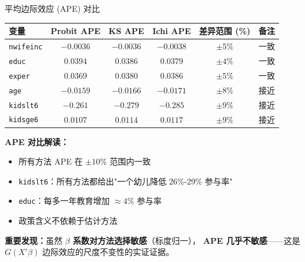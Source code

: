 \documentclass[aspectratio=169, 10pt]{beamer}
\begin{document}
\begin{frame}{平均边际效应 (APE) 对比}

  \begin{center}\footnotesize
  \begin{tabular}{l|c|c|c|c|c}
  \hline
  变量 & Probit APE & KS APE & Ichi APE & 差异范围 (\%) & 备注 \\
  \hline
  \texttt{nwifeinc} & $-0.0036$ & $-0.0036$ & $-0.0038$ & $\pm 5\%$ & 一致 \\
  \texttt{educ} & $0.0394$ & $0.0386$ & $0.0379$ & $\pm 4\%$ & 一致 \\
  \texttt{exper} & $0.0369$ & $0.0380$ & $0.0386$ & $\pm 5\%$ & 一致 \\
  \texttt{age} & $-0.0159$ & $-0.0166$ & $-0.0171$ & $\pm 8\%$ & 接近 \\
  \texttt{kidslt6} & $-0.261$ & $-0.279$ & $-0.285$ & $\pm 9\%$ & 接近 \\
  \texttt{kidsge6} & $0.0107$ & $0.0114$ & $0.0117$ & $\pm 9\%$ & 接近 \\
  \hline
  \end{tabular}
  \end{center}

  \begin{highlightbox}
    \textbf{APE 对比解读：}
    \begin{itemize}\setlength{\itemsep}{1pt}
      \item 所有方法 APE 在 $\pm 10\%$ 范围内一致
      \item \texttt{kidslt6}：所有方法都给出"一个幼儿降低 26\%-29\% 参与率"
      \item \texttt{educ}：每多一年教育增加 $\approx 4\%$ 参与率
      \item 政策含义不依赖于估计方法
    \end{itemize}
  \end{highlightbox}

  \begin{keybox}
    \textbf{重要发现：}虽然 \textbf{$\beta$ 系数对方法选择敏感}（标度归一），
    \textbf{APE 几乎不敏感}——这是 $G(X'\beta)$ 边际效应的尺度不变性的实证证据。
  \end{keybox}

\end{frame}
\end{document}
